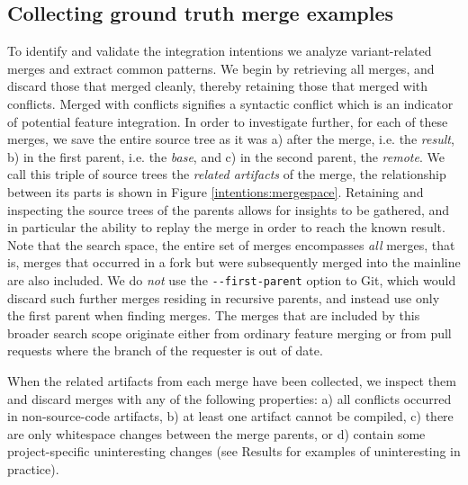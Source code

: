 \subsection{Collecting ground truth merge examples}
To identify and validate the integration intentions we analyze variant-related merges and extract common patterns. We begin by retrieving all merges, and discard those that merged cleanly, thereby retaining those that merged with conflicts. Merged with conflicts signifies a syntactic conflict which is an indicator of potential feature integration. In order to investigate further, for each of these merges, we save the entire source tree as it was 
a) after the merge, i.e. the \textit{result},
b) in the first parent, i.e. the \textit{base}, and
c) in the second parent, the \textit{remote}. We call this triple of source trees the \textit{related artifacts} of the merge, the relationship between its parts is shown in Figure \ref{intentions:mergespace}. Retaining and inspecting the source trees of the parents allows for insights to be gathered, and in particular the ability to replay the merge in order to reach the known result. Note that the search space, the entire set of merges encompasses \textit{all} merges, that is, merges that occurred in a fork but were subsequently merged into the mainline are also included. We do \textit{not} use the \texttt{-{}-first-parent} option to Git, which would discard such further merges residing in recursive parents, and instead use only the first parent when finding merges. The merges that are included by this broader search scope originate either from ordinary feature merging or from pull requests where the branch of the requester is out of date.%

When the related artifacts from each merge have been collected, we inspect them and discard merges with any of the following properties: 
a) all conflicts occurred in non-source-code artifacts, b) at least one artifact cannot be compiled, c) there are only whitespace changes between the merge parents, or d) contain some project-specific uninteresting changes (see Results for examples of uninteresting in practice).

